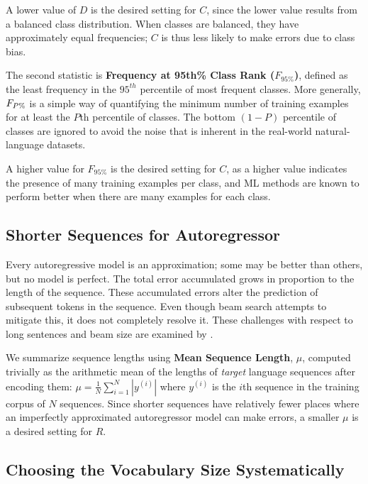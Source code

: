 A lower value of $D$ is the desired setting for $C$, since the lower value results from a balanced class distribution. 
When classes are balanced, they have approximately equal frequencies; $C$ is thus less likely to make errors due to class bias.

The second statistic is \textbf{Frequency at 95th\% Class Rank (\textbf{$F_{95\%}$})}, defined as the least frequency in the $95^{th}$ percentile of most frequent classes.
More generally, $F_{\large{P\%}}$ is a simple way of quantifying the minimum number of training examples for at least the $P$th percentile of classes.
The bottom $(1-P)$ percentile of classes are ignored to avoid the noise that is inherent in the real-world natural-language datasets.

A higher value for $F_{95\%}$ is the desired setting for $C$, as a higher value indicates the presence of many training examples per class, and ML methods are known to perform better when there are many examples for each class.  


\subsection{Shorter Sequences for Autoregressor}
\label{sec:ar-short-seq}

Every autoregressive model is an approximation; some may be better than others, but no model is perfect. 
The total error accumulated grows in proportion to the length of the sequence.
These accumulated errors alter the prediction of subsequent tokens in the sequence.
Even though beam search attempts to mitigate this, it does not completely resolve it.  
These challenges with respect to long sentences and beam size are examined by \citet{koehn2017sixchallenges}.


We summarize sequence lengths using \textbf{Mean Sequence Length}, $\mu$, 
computed trivially as the arithmetic mean of the lengths of \textit{target} language sequences after encoding them:
$\mu = \frac{1}{N} \sum_{i=1}^N |y^{(i)}|$
where $y^{(i)}$ is the $i$th sequence in the training corpus of $N$ sequences.
Since shorter sequences have relatively fewer places where an imperfectly approximated autoregressor model can make errors, a smaller $\mu$ is a desired setting for $R$.

\subsection{Choosing the Vocabulary Size Systematically}
\label{sec:bpe}

